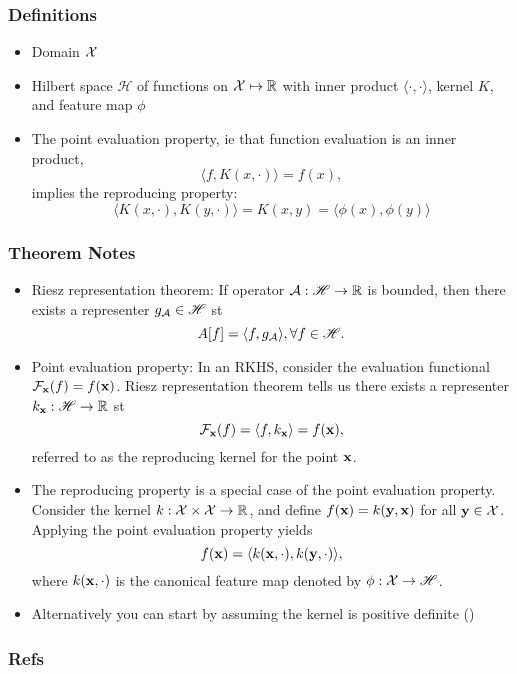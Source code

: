 \documentclass{beamer}
\begin{document}
\begin{frame}
\frametitle{Definitions}
\begin{itemize}
\item Domain $\mathcal{X}$
\vspace{1em}
\item Hilbert space $\mathscr{H}$ of functions on $\mathcal{X}\mapsto\mathbb{R}$
    with inner product $\langle\cdot,\cdot\rangle$, kernel $K$,
    and feature map $\phi$
\vspace{1em}
\item The point evaluation property, 
ie that function evaluation is an inner product,
$$\langle f, K(x, \cdot) \rangle = f(x),$$
implies the reproducing property:
$$ \langle K(x,\cdot), K(y, \cdot) \rangle = K(x,y) = \langle \phi(x), \phi(y) \rangle$$
\end{itemize}
\end{frame}

\begin{frame}
\frametitle{Theorem Notes}
\begin{itemize}
\item Riesz representation theorem: If operator $\mathcal{A}: \mathscr{H} \to \mathbb{R}$
is bounded, then there exists a representer $g_{\mathcal{A}} \in \mathscr{H}$ st
$$A[f] = \langle f, g_{\mathcal{A}} \rangle, \forall f \in \mathscr{H}.$$
\item Point evaluation property: In an RKHS, consider the evaluation functional
$\mathcal{F}_{\mathbf{x}}(f) = f(\mathbf{x})$. Riesz representation theorem tells us there exists a
representer $k_{\mathbf{x}}: \mathscr{H}\to\mathbb{R}$ st
$$\mathcal{F}_{\mathbf{x}}(f) = \langle f, k_{\mathbf{x}}\rangle = f(\mathbf{x}),$$
referred to as the reproducing kernel for the point $\mathbf{x}$.
\item The reproducing property is a special case of the point evaluation
property. Consider the kernel $k: \mathcal{X} \times \mathcal{X} \to \mathbb{R}$,
and define $f(\mathbf{x}) = k(\mathbf{y}, \mathbf{x})$ for all $\mathbf{y} \in \mathcal{X}$.
Applying the point evaluation property yields
$$f(\mathbf{x}) = \langle k(\mathbf{x}, \cdot),  k(\mathbf{y}, \cdot)\rangle,$$
where $k(\mathbf{x}, \cdot)$ is the canonical feature map denoted by $\phi: \mathcal{X}\to\mathscr{H}$.
\item Alternatively you can start by assuming the kernel is positive definite ()
\end{itemize}
\end{frame}

\begin{frame}
\frametitle{Refs}

\end{frame}
\end{document}
